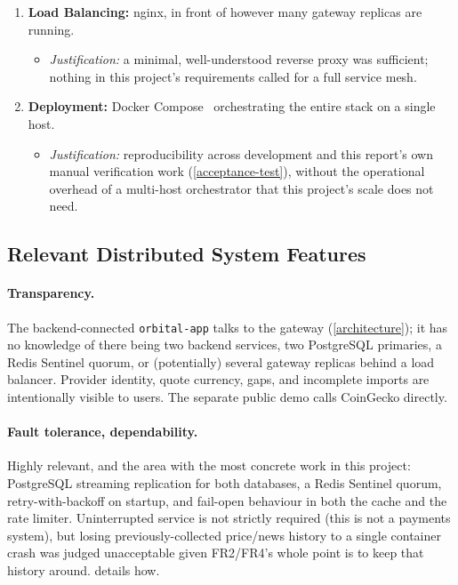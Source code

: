 \documentclass{scrartcl}
\begin{document}
\begin{enumerate}
  \item \textbf{Load Balancing:} nginx, in front of however many gateway replicas are running.
  \begin{itemize}
    \item \emph{Justification:} a minimal, well-understood reverse proxy was sufficient; nothing
    in this project's requirements called for a full service mesh.
  \end{itemize}

  \item \textbf{Deployment:} Docker Compose~\citep{docker2024compose} orchestrating the entire
  stack on a single host.
  \begin{itemize}
    \item \emph{Justification:} reproducibility across development and this report's own manual
    verification work (\cref{acceptance-test}), without the operational overhead of a
    multi-host orchestrator that this project's scale does not need.
  \end{itemize}
\end{enumerate}

\subsection{Relevant Distributed System Features}\label{ds-features}

\paragraph{Transparency.} The backend-connected \texttt{orbital-app} talks
to the gateway (\cref{architecture}); it has no knowledge of there being two backend services,
two PostgreSQL primaries, a Redis Sentinel quorum, or (potentially) several gateway replicas
behind a load balancer. Provider identity, quote currency, gaps, and incomplete imports are
intentionally visible to users. The separate public demo calls CoinGecko directly.

\paragraph{Fault tolerance, dependability.} Highly relevant, and the area with the most concrete
work in this project: PostgreSQL streaming replication for both databases, a Redis Sentinel
quorum, retry-with-backoff on startup, and fail-open behaviour in both the cache and the rate
limiter. Uninterrupted service is not strictly required (this is not a payments system), but
losing previously-collected price/news history to a single container crash was judged
unacceptable given FR2/FR4's whole point is to keep that history around. 
details how.
\end{document}
